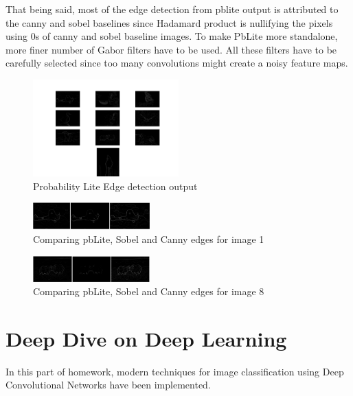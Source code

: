 \documentclass[conference]{IEEEtran}
\begin{document}
		That being said, most of the edge detection from pblite output is attributed to the canny and sobel baselines since Hadamard product is nullifying the pixels using 0s of canny and sobel baseline images. To make PbLite more standalone, more finer number of Gabor filters have to be used. All these filters have to be carefully selected since too many convolutions might create a noisy feature maps. 
		\begin{figure}
			\centering
			\captionsetup{justification=centering,margin=2cm}
			\includegraphics[width=0.5\textwidth,trim={1cm 0cm 1cm 2cm}]{pbEdges.png}
			\caption{Probability Lite Edge detection output}
			\label{fig:pbedges}
		\end{figure}

		\begin{figure}
			\centering
			\captionsetup{justification=centering,margin=2cm}
			\includegraphics[width=0.4\textwidth,trim={1cm 0cm 1cm 2cm}]{phase_1_compare/1.png}
			\caption{Comparing pbLite, Sobel and Canny edges for image 1}
			\label{fig:compare_1_edges}
		\end{figure}
	
		\begin{figure}
			\centering
			\captionsetup{justification=centering,margin=2cm}
			\includegraphics[width=0.4\textwidth,trim={1cm 0cm 1cm 2cm}]{phase_1_compare/8.png}
			\caption{Comparing pbLite, Sobel and Canny edges for image 8}
			\label{fig:compare_8_edges}
		\end{figure}
		
		
		\section{Deep Dive on Deep Learning}
		In this part of homework, modern techniques for image classification using Deep Convolutional Networks have been implemented.
\end{document}
